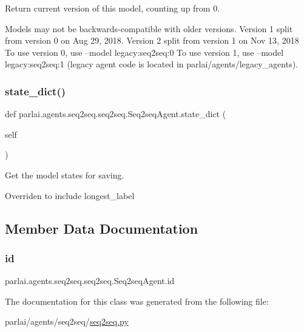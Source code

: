 \begin{DoxyVerb}Return current version of this model, counting up from 0.

Models may not be backwards-compatible with older versions. Version 1 split from
version 0 on Aug 29, 2018. Version 2 split from version 1 on Nov 13, 2018 To use
version 0, use --model legacy:seq2seq:0 To use version 1, use --model
legacy:seq2seq:1 (legacy agent code is located in parlai/agents/legacy_agents).
\end{DoxyVerb}
 \mbox{\label{classparlai_1_1agents_1_1seq2seq_1_1seq2seq_1_1Seq2seqAgent_a7b68df3db0fcadb70a97a28ec2617cb2}} 
\subsubsection{\texorpdfstring{state\+\_\+dict()}{state\_dict()}}
{\footnotesize\ttfamily def parlai.\+agents.\+seq2seq.\+seq2seq.\+Seq2seq\+Agent.\+state\+\_\+dict (\begin{DoxyParamCaption}\item[{}]{self }\end{DoxyParamCaption})}

\begin{DoxyVerb}Get the model states for saving.

Overriden to include longest_label
\end{DoxyVerb}
 

\subsection{Member Data Documentation}
\mbox{\label{classparlai_1_1agents_1_1seq2seq_1_1seq2seq_1_1Seq2seqAgent_a5254266798a52da5d4df057f5d8dc213}} 
\subsubsection{\texorpdfstring{id}{id}}
{\footnotesize\ttfamily parlai.\+agents.\+seq2seq.\+seq2seq.\+Seq2seq\+Agent.\+id}



The documentation for this class was generated from the following file\+:\begin{DoxyCompactItemize}
\item 
parlai/agents/seq2seq/\hyperlink{agents_2seq2seq_2seq2seq_8py}{seq2seq.\+py}\end{DoxyCompactItemize}
